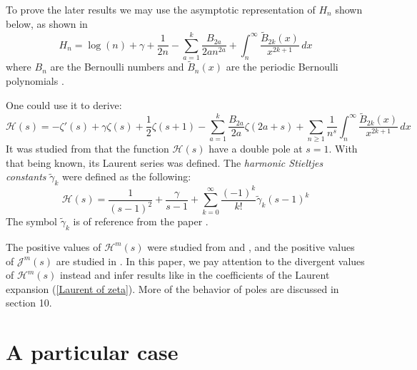 \documentclass{article}
\newcommand{\Hz}[1]{\mathcal{H}(#1)}
\begin{document}
To prove the later results we may use the asymptotic representation of $H_n$ shown below, as shown in \cite{apostol1984dirichlet}
\begin{equation}\label{Asymp. Harmonic}H_n=\log(n)+\gamma +\frac{1}{2n}-\sum_{a=1}^k \frac{B_{2a}}{2an^{2a}} +\int_n^{\infty} \frac{\tilde B_{2k}(x)}{x^{2k+1}}\, dx\end{equation}
where $B_n$ are the Bernoulli numbers and $\tilde B_n(x)$ are the periodic Bernoulli polynomials \cite{lehmer1988new}.

One could use it to derive:
\begin{equation}\label{EM of Harmonic zeta function v1}
    \Hz{s}=-\zeta'(s)+\gamma \zeta(s)+\frac{1}{2}\zeta({s+1})-\sum_{a=1}^k \frac{B_{2a}}{2a} \zeta({2a+s}) +\sum_{n\geq 1}\frac{1}{n^s}\int_n^{\infty} \frac{\tilde B_{2k}(x)}{x^{2k+1}}\, dx
\end{equation}
It was studied from \cite{candelpergher2020laurent} that the function $\mathcal{H}(s)$ have a double pole at $s=1$. With that being known, its Laurent series was defined. The \textit{harmonic Stieltjes constants} $\tilde{\gamma}_k$ were defined as the following:
\begin{equation}\label{definition of harmonic Steiltjes}\mathcal{H}(s)=\frac{1}{(s-1)^2}+\frac{\gamma}{s-1}+\sum_{k=0}^{\infty} \frac{(-1)^k}{k!}\tilde{\gamma}_k (s-1)^k\end{equation}
The symbol $\tilde{\gamma}_k$ is of reference from the paper \cite{candelpergher2020laurent}.

The positive values of $\mathcal{H}^m(s)$ were studied from \cite{flajolet1998euler} and \cite{bailey1994experimental}, and the positive values of $\mathcal{J}^m(s)$ are studied in \cite{flajolet1998euler}. In this paper, we pay attention to the divergent values of $\mathcal{H}^m(s)$ instead and infer results like in the coefficients of the Laurent expansion (\ref{Laurent of zeta}). More of the behavior of poles are discussed in section 10.
\section{A particular case}
\end{document}

